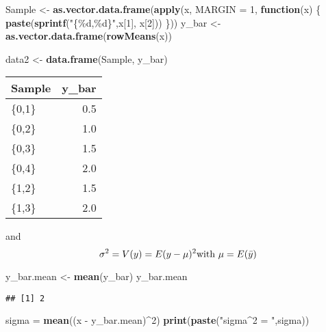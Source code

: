 \documentclass[
]{article}
\newenvironment{Shaded}{\begin{snugshade}}{\end{snugshade}}
\newcommand{\AttributeTok}[1]{\textcolor[rgb]{0.74,0.68,0.62}{#1}}
\newcommand{\ControlFlowTok}[1]{\textcolor[rgb]{0.26,0.66,0.93}{\textbf{#1}}}
\newcommand{\DecValTok}[1]{\textcolor[rgb]{0.27,0.67,0.26}{#1}}
\newcommand{\FunctionTok}[1]{\textcolor[rgb]{1.00,0.58,0.35}{\textbf{#1}}}
\newcommand{\NormalTok}[1]{\textcolor[rgb]{0.74,0.68,0.62}{#1}}
\newcommand{\OtherTok}[1]{\textcolor[rgb]{0.74,0.68,0.62}{#1}}
\newcommand{\SpecialCharTok}[1]{\textcolor[rgb]{0.02,0.61,0.04}{#1}}
\newcommand{\StringTok}[1]{\textcolor[rgb]{0.02,0.61,0.04}{#1}}
\begin{document}
\begin{Shaded}
\begin{Highlighting}[]
\NormalTok{Sample }\OtherTok{\textless{}{-}} \FunctionTok{as.vector.data.frame}\NormalTok{(}\FunctionTok{apply}\NormalTok{(x, }\AttributeTok{MARGIN =} \DecValTok{1}\NormalTok{, }\ControlFlowTok{function}\NormalTok{(x) \{}
  \FunctionTok{paste}\NormalTok{(}\FunctionTok{sprintf}\NormalTok{(}\StringTok{"\{\%d,\%d\}"}\NormalTok{,x[}\DecValTok{1}\NormalTok{], x[}\DecValTok{2}\NormalTok{]))}
\NormalTok{\}))}
\NormalTok{y\_bar }\OtherTok{\textless{}{-}} \FunctionTok{as.vector.data.frame}\NormalTok{(}\FunctionTok{rowMeans}\NormalTok{(x))}

\NormalTok{data2 }\OtherTok{\textless{}{-}} \FunctionTok{data.frame}\NormalTok{(Sample, y\_bar)}
\end{Highlighting}
\end{Shaded}

\begin{longtable}[]{@{}lr@{}}
\toprule()
Sample & y\_bar \\
\midrule()
\endhead
\{0,1\} & 0.5 \\
\{0,2\} & 1.0 \\
\{0,3\} & 1.5 \\
\{0,4\} & 2.0 \\
\{1,2\} & 1.5 \\
\{1,3\} & 2.0 \\
\bottomrule()
\end{longtable}

and \[\sigma^2 = V(y) = E(y-\mu)^2 \\
\text{with } \mu = E(\bar{y})
\]

\begin{Shaded}
\begin{Highlighting}[]
\NormalTok{y\_bar.mean }\OtherTok{\textless{}{-}} \FunctionTok{mean}\NormalTok{(y\_bar)}
\NormalTok{y\_bar.mean}
\end{Highlighting}
\end{Shaded}

\begin{verbatim}
## [1] 2
\end{verbatim}

\begin{Shaded}
\begin{Highlighting}[]
\NormalTok{sigma }\OtherTok{=} \FunctionTok{mean}\NormalTok{((x }\SpecialCharTok{{-}}\NormalTok{ y\_bar.mean)}\SpecialCharTok{\^{}}\DecValTok{2}\NormalTok{)}
\FunctionTok{print}\NormalTok{(}\FunctionTok{paste}\NormalTok{(}\StringTok{"sigma\^{}2 = "}\NormalTok{,sigma))}
\end{Highlighting}
\end{Shaded}
\end{document}
